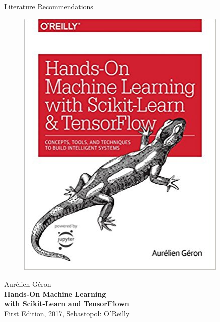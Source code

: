 \documentclass[document.tex]{subfiles}
\begin{document}
\begin{frame}{Literature Recommendations}
        \begin{minipage}{0.1\textwidth}
            \begin{figure}[H]
                \includegraphics[height=0.2\textheight, width=0.9\textwidth, left]{assets/book-covers/geron2017.jpg}
            \end{figure}
        \end{minipage}
        \begin{minipage}{0.32\textwidth}
            \footnotesize Aurélien Géron \normalsize \\[-0.5mm]
            \small \textbf{Hands-On Machine Learning} \\[-0.8mm]
            \textbf{with Scikit-Learn and TensorFlown} \normalsize \\
            \tiny First Edition, 2017, Sebastopol: O'Reilly \normalsize
        \end{minipage}
        \begin{minipage}{0.1\textwidth}
            \begin{figure}[H]

\end{figure}
\end{minipage}
\end{frame}
\end{document}
